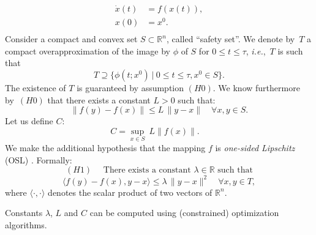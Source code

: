 \begin{equation}
\begin{aligned}
  \dot  x(t) & =  f( x(t)), \\
   x(0) & =   x^0. \\
\end{aligned}
 \label{eq:sampled-sys_part4}
\end{equation}
%
Consider a compact and convex set  $S\subset\mathbb{R}^n$,
called ``safety set''.
%
We denote by~$T$ a compact overapproximation of the image by $\phi$ of $S$ for $0\leq t\leq \tau$, %
\textit{i.e.},~$T$ is such that
$$ T\supseteq \{\phi(t;x^0) \ |\  0\leq t\leq\tau, x^0\in S\}.$$
The existence of $T$ is guaranteed by assumption $(H0)$. We know furthermore
by~$(H0)$ that there exists a constant $L>0$ such that:
\begin{equation}
\|  f( y)- f( x) \| \leq L \, \| y- x\|\quad \forall  x, y\in S.
\label{eq:lipschitz_part4}
\end{equation}
Let us define $C$:
\begin{equation}
C = \sup_{x\in S}\  L\|f(x)\|.
\quad
\label{eq:L_part4}
\end{equation}
%
We make the additional hypothesis
that the mapping $f$ is {\em one-sided Lipschitz} (OSL)
\cite{donchev1998stability}.
Formally:
%
$$(H1)
\quad \mbox{ There exists a constant $\lambda\in \mathbb{R}$ such that}$$
\[
\langle  f( y)- f( x),  y- x \rangle \leq \lambda\, \| y- x\|^2\quad
\forall  x, y\in T,
\]
where $\langle \cdot, \cdot\rangle$ denotes the scalar product of two vectors of $\mathbb{R}^n$.
%

\vspace{1em}

\begin{remark}
Constants $\lambda$, $L$ and $C$   can
be computed using (constrained) optimization algorithms.
\end{remark}



